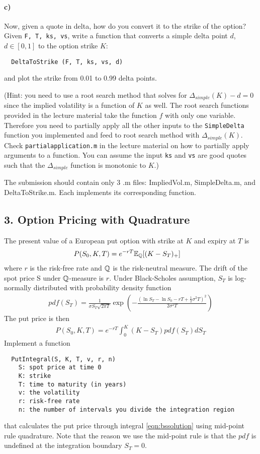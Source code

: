 \documentclass[12pt,a4paper,hidelinks,fleqn]{article}            %
\begin{document}
\paragraph{c)} Now, given a quote in delta, how do you convert it to the strike of the option?
Given \verb=F, T, ks, vs=, write a function that converts a simple delta point $d$, $d \in [0, 1]$ to the option strike $K$:
\begin{verbatim}
  DeltaToStrike (F, T, ks, vs, d)
\end{verbatim}
and plot the strike from 0.01 to 0.99 delta points.

(Hint: you need to use a root search method that solves for $\Delta_{simple}(K) - d = 0$ since the implied volatility is a function of $K$ as well.
The root search functions provided in the lecture material take the function $f$ with only one variable. 
Therefore you need to partially apply all the other inputs to the \verb=SimpleDelta= function you implemented and feed to root search method with $\Delta_{simple}(K)$.
Check \verb=partialapplication.m= in the lecture material on how to partially apply arguments to a function.
You can assume the input \verb=ks= and \verb=vs= are good quotes such that the $\Delta_{simple}$ function is monotonic to $K$.)


The submission should contain only 3 .m files: ImpliedVol.m, SimpleDelta.m, and DeltaToStrike.m. Each implements its corresponding function.

\subsection*{3. Option Pricing with Quadrature}
The present value of a European put option with strike at $K$ and expiry at $T$ is
\begin{align*}
P(S_0, K, T) & = e^{-rT}\mathbb{E}_{\mathbb{Q}} [(K - S_T)_+]
\end{align*}
where $r$ is the risk-free rate and $\mathbb{Q}$ is the risk-neutral measure.
The drift of the spot price S under $\mathbb{Q}$-measure is $r$.
Under Black-Scholes assumption, $S_T$ is log-normally distributed with probability density function
\begin{align*}
pdf(S_T) = \frac{1}{\sigma S_T\sqrt{2\pi T}} \exp\left(- \frac{(\ln S_T - \ln S_0 - rT + \frac{1}{2}\sigma^2T)^2}{ 2\sigma^2 T} \right)
\end{align*}
The put price is then
\begin{align}
\label{eqn:bssolution}
  P(S_0, K, T) = e^{-rT}\int_0^K \left(K - S_T\right) pdf(S_T) dS_T 
\end{align}
Implement a function
\vspace{-6mm}
\begin{verbatim}
  PutIntegral(S, K, T, v, r, n)
    S: spot price at time 0
    K: strike
    T: time to maturity (in years)
    v: the volatility
    r: risk-free rate
    n: the number of intervals you divide the integration region 
\end{verbatim}
\vspace{-6mm}
that calculates the put price through integral \eqref{eqn:bssolution} using mid-point rule quadrature.
Note that the reason we use the mid-point rule is that the $pdf$ is undefined at the integration boundary $S_T=0$.
\end{document}
